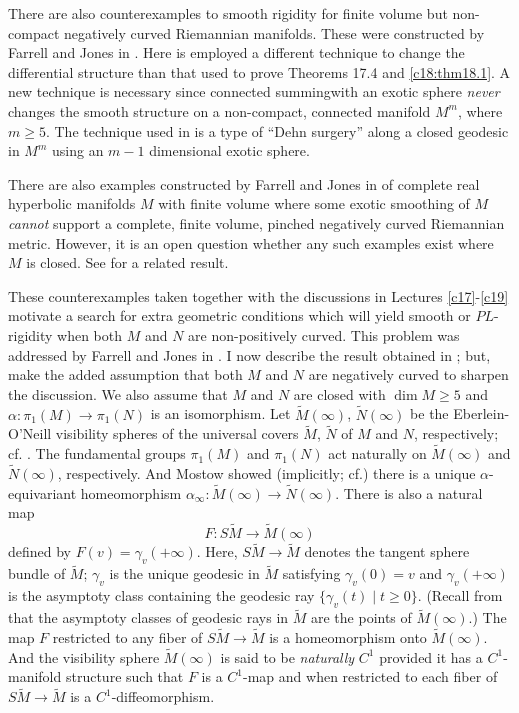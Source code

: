 There are also counterexamples to smooth rigidity for finite volume
but non-compact negatively curved Riemannian manifolds. These were
constructed by Farrell and Jones in \cite{44}. Here is employed a
different technique to change the differential structure than that
used to prove Theorems 17.4 and \ref{c18:thm18.1}. A new
technique is necessary since connected summing\pageoriginale with an
exotic sphere {\em never} changes the smooth structure on a
non-compact, connected manifold $M^{m}$, where $m\geq 5$. The
technique used in \cite{44} is a type of ``Dehn surgery'' along a
closed geodesic in $M^{m}$ using an $m-1$ dimensional exotic sphere.

There are also examples constructed by Farrell and Jones in \cite{47}
of complete real hyperbolic manifolds $M$ with finite volume where
some exotic smoothing of $M$ {\em cannot} support a complete, finite
volume, pin\-ched negatively curved Riemannian metric. However, it is an
open question whether any such examples exist where $M$ is closed. See
\cite{3} for a related result.

These counterexamples taken together with the discussions in Lectures
\ref{c17}-\ref{c19} motivate a search for extra geometric conditions
which will yield smooth or $PL$-rigidity when both $M$ and $N$ are
non-positively curved. This problem was addressed by Farrell and Jones
in \cite{49}. I now describe the result obtained in \cite{49}; but,
make the added assumption that both $M$ and $N$ are negatively curved
to sharpen the discussion. We also assume that $M$ and $N$ are closed
with $\dim M\geq 5$ and $\alpha:\pi_{1}(M)\to \pi_{1}(N)$ is an
isomorphism. Let $\tilde{M}(\infty)$, $\tilde{N}(\infty)$ be the
Eberlein-O'Neill visibility spheres of the universal covers
$\tilde{M}$, $\tilde{N}$ of $M$ and $N$, respectively; cf.\@
\cite{26}. The fundamental groups $\pi_{1}(M)$ and $\pi_{1}(N)$ act
naturally on $\tilde{M}(\infty)$ and $\tilde{N}(\infty)$,
respectively. And Mostow showed (implicitly; cf.\@ \cite{75}) there is
a unique $\alpha$-equivariant homeomorphism
$\alpha_{\infty}:\tilde{M}(\infty)\to \tilde{N}(\infty)$. There is
also a natural map
$$
F:S\tilde{M}\to \tilde{M}(\infty)
$$
defined by $F(v)=\gamma_{v}(+\infty)$. Here, $S\tilde{M}\to \tilde{M}$
denotes the tangent sphere bundle of $\tilde{M}$;  $\gamma_{v}$ is the
unique geodesic in $\tilde{M}$ satisfying $\gamma_{v}(0)=v$ and
$\gamma_{v}(+\infty)$ is the asymptoty class containing the geodesic
ray $\{\gamma_{v}(t)\mid t\geq 0\}$. (Recall from \cite{26} that the
asymptoty classes of geodesic rays in $\tilde{M}$ are the points of
$\tilde{M}(\infty)$.) The map $F$ restricted to any fiber of
$S\tilde{M}\to \tilde{M}$ is a homeomorphism onto
$\tilde{M}(\infty)$. And the visibility sphere $\tilde{M}(\infty)$ is
said to be {\em naturally} $C^{1}$ provided it has a $C^{1}$-manifold
structure such that $F$ is a $C^{1}$-map and when restricted to each
fiber of $S\tilde{M}\to \tilde{M}$ is a $C^{1}$-diffeomorphism.

